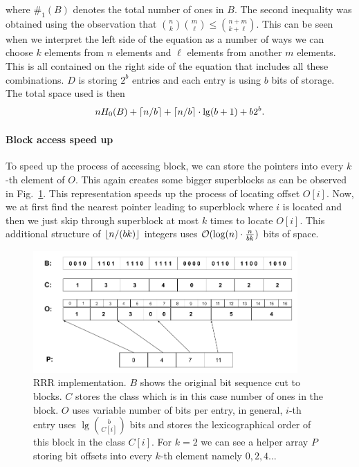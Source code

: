 where $\#_1(B)$ denotes the total number of ones in $B$. The second inequality was obtained using
the observation that ${n\choose k} {m\choose \ell} \leq {n+m\choose k+\ell}$. This can be seen
when we interpret the left side of the equation as a number of ways we can choose $k$ elements
from $n$ elements and $\ell$ elements from another $m$ elements. This is all contained on the
right side of the equation that includes all these combinations. $D$ is storing $2^b$ entries
and each entry is using $b$ bits of storage. The total space used is then
$$nH_0(B) + \left\lceil n/b \right\rceil + \left\lceil n/b \right\rceil \cdot \mathop{\mathrm{lg}}(b+1) + b2^b.$$

\paragraph{Block access speed up}

To speed up the process of accessing block, we can store the pointers into every $k$-th element
of $O$. This again creates some bigger superblocks as can be observed in Fig.~\ref{obr:RRRFinal}.
This representation speeds up the process of locating offset $O[i]$. Now, we at first find the
nearest pointer leading to superblock where $i$ is located and then we just skip through superblock
at most $k$ times to locate $O[i]$. This additional structure of $\left\lfloor n/(bk) \right\rfloor$ integers uses
$\mathcal{O}(\log(n)\cdot \frac{n}{bk})$ bits of space.

\begin{figure}
	\centerline{
		\includegraphics[width=0.9\textwidth, height=0.3\textheight]{images/rrr}
	}
	\caption[TODO]{RRR implementation. $B$ shows the original bit sequence cut to
    blocks. $C$ stores the class which is in this case number of ones in the block.
    $O$ uses variable number of bits per entry, in general, $i$-th entry uses
    $\lg {b\choose C[i]}$ bits and stores the lexicographical order
    of this block in the class $C[i]$. For $k=2$ we can see a helper array $P$
    storing bit offsets into every $k$-th element namely $0, 2, 4\ldots$
	}
	\label{obr:RRRFinal}
\end{figure}

